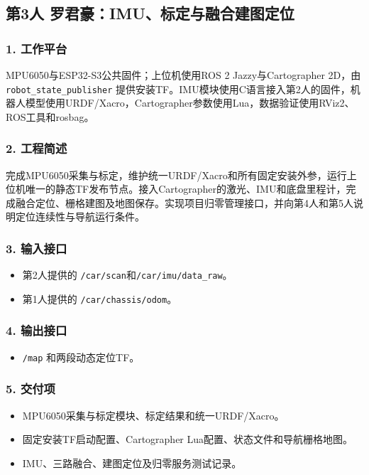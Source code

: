 \documentclass[UTF8,fontset=fandol,11pt,a4paper]{ctexart}
\begin{document}
\subsection{第3人 罗君豪：IMU、标定与融合建图定位}
\subsubsection*{1. 工作平台}
MPU6050与ESP32-S3公共固件；上位机使用ROS 2 Jazzy与Cartographer 2D，由 \nolinkurl{robot_state_publisher} 提供安装TF。IMU模块使用C语言接入第2人的固件，机器人模型使用URDF/Xacro，Cartographer参数使用Lua，数据验证使用RViz2、ROS工具和rosbag。

\subsubsection*{2. 工程简述}
完成MPU6050采集与标定，维护统一URDF/Xacro和所有固定安装外参，运行上位机唯一的静态TF发布节点。接入Cartographer的激光、IMU和底盘里程计，完成融合定位、栅格建图及地图保存。实现项目归零管理接口，并向第4人和第5人说明定位连续性与导航运行条件。

\subsubsection*{3. 输入接口}
\begin{itemize}
\item 第2人提供的 \nolinkurl{/car/scan}和\nolinkurl{/car/imu/data_raw}。
\item 第1人提供的 \nolinkurl{/car/chassis/odom}。
\end{itemize}

\subsubsection*{4. 输出接口}
\begin{itemize}
\item \nolinkurl{/map} 和两段动态定位TF。
\end{itemize}

\subsubsection*{5. 交付项}
\begin{itemize}
\item MPU6050采集与标定模块、标定结果和统一URDF/Xacro。
\item 固定安装TF启动配置、Cartographer Lua配置、状态文件和导航栅格地图。
\item IMU、三路融合、建图定位及归零服务测试记录。
\end{itemize}
\end{document}

